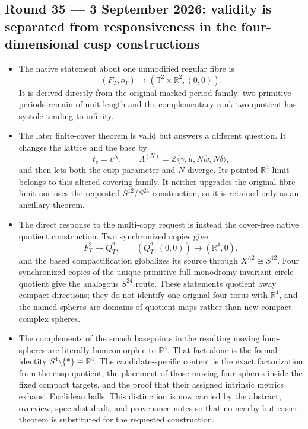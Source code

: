 \subsection*{Round 35 --- 3 September 2026: validity is separated from
responsiveness in the four-dimensional cusp constructions}

\begin{itemize}[leftmargin=1.8em]
\item The native statement about one unmodified regular fibre is
\[
 (F_T,o_T)\longrightarrow
 (\mathbb T^2\times\mathbb R^2,(0,0)).
\]
It is derived directly from the original marked period family: two primitive
periods remain of unit length and the complementary rank-two quotient has
systole tending to infinity.

\item The later finite-cover theorem is valid but answers a different
question.  It changes the lattice and the base by
\[
 t_c=v^N,
 \qquad
 \Lambda^{(N)}=\mathbb Z\langle\widehat\gamma,\widehat u,
 N\widehat w,N\widehat\delta\rangle,
\]
and then lets both the cusp parameter and \(N\) diverge.  Its pointed
\(\mathbb R^4\) limit belongs to this altered covering family.  It neither
upgrades the original fibre limit nor uses the requested
\(S^{12}/S^{24}\) construction, so it is retained only as an ancillary
theorem.

\item The direct response to the multi-copy request is instead the cover-free
native quotient construction.  Two synchronized copies give
\[
 F_T^2\longrightarrow Q_T^2,
 \qquad
 (Q_T^2,(0,0))\longrightarrow(\mathbb R^4,0),
\]
and the based compactification globalizes its source through
\(X^{\wedge2}\cong S^{12}\).  Four synchronized copies of the unique
primitive full-monodromy-invariant circle quotient give the analogous
\(S^{24}\) route.  These statements quotient away compact directions; they
do not identify one original four-torus with \(\mathbb R^4\), and the named
spheres are domains of quotient maps rather than new compact complex
spheres.

\item The complements of the smash basepoints in the resulting moving
four-spheres are literally homeomorphic to \(\mathbb R^4\).  That fact alone
is the formal identity \(S^4\setminus\{*\}\cong\mathbb R^4\).  The
candidate-specific content is the exact factorization from the cusp quotient,
the placement of those moving four-spheres inside the fixed compact targets,
and the proof that their assigned intrinsic metrics exhaust Euclidean balls.
This distinction is now carried by the abstract, overview, specialist draft,
and provenance notes so that no nearby but easier theorem is substituted for
the requested construction.


\end{itemize}
